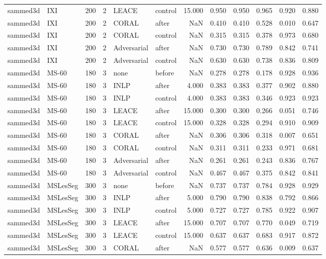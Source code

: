 \begin{tabular}{llrrllrrrrrr}
sammed3d & IXI & 200 & 2 & LEACE & control & 15.000 & 0.950 & 0.950 & 0.965 & 0.920 & 0.880 \\
sammed3d & IXI & 200 & 2 & CORAL & after & NaN & 0.410 & 0.410 & 0.528 & 0.010 & 0.647 \\
sammed3d & IXI & 200 & 2 & CORAL & control & NaN & 0.315 & 0.315 & 0.378 & 0.973 & 0.680 \\
sammed3d & IXI & 200 & 2 & Adversarial & after & NaN & 0.730 & 0.730 & 0.789 & 0.842 & 0.741 \\
sammed3d & IXI & 200 & 2 & Adversarial & control & NaN & 0.630 & 0.630 & 0.738 & 0.836 & 0.809 \\
sammed3d & MS-60 & 180 & 3 & none & before & NaN & 0.278 & 0.278 & 0.178 & 0.928 & 0.936 \\
sammed3d & MS-60 & 180 & 3 & INLP & after & 4.000 & 0.383 & 0.383 & 0.377 & 0.902 & 0.880 \\
sammed3d & MS-60 & 180 & 3 & INLP & control & 4.000 & 0.383 & 0.383 & 0.346 & 0.923 & 0.923 \\
sammed3d & MS-60 & 180 & 3 & LEACE & after & 15.000 & 0.300 & 0.300 & 0.266 & 0.051 & 0.746 \\
sammed3d & MS-60 & 180 & 3 & LEACE & control & 15.000 & 0.328 & 0.328 & 0.294 & 0.910 & 0.909 \\
sammed3d & MS-60 & 180 & 3 & CORAL & after & NaN & 0.306 & 0.306 & 0.318 & 0.007 & 0.651 \\
sammed3d & MS-60 & 180 & 3 & CORAL & control & NaN & 0.311 & 0.311 & 0.233 & 0.971 & 0.681 \\
sammed3d & MS-60 & 180 & 3 & Adversarial & after & NaN & 0.261 & 0.261 & 0.243 & 0.836 & 0.767 \\
sammed3d & MS-60 & 180 & 3 & Adversarial & control & NaN & 0.467 & 0.467 & 0.375 & 0.842 & 0.841 \\
sammed3d & MSLesSeg & 300 & 3 & none & before & NaN & 0.737 & 0.737 & 0.784 & 0.928 & 0.929 \\
sammed3d & MSLesSeg & 300 & 3 & INLP & after & 5.000 & 0.790 & 0.790 & 0.838 & 0.792 & 0.866 \\
sammed3d & MSLesSeg & 300 & 3 & INLP & control & 5.000 & 0.727 & 0.727 & 0.785 & 0.922 & 0.907 \\
sammed3d & MSLesSeg & 300 & 3 & LEACE & after & 15.000 & 0.707 & 0.707 & 0.770 & 0.049 & 0.719 \\
sammed3d & MSLesSeg & 300 & 3 & LEACE & control & 15.000 & 0.637 & 0.637 & 0.683 & 0.917 & 0.872 \\
sammed3d & MSLesSeg & 300 & 3 & CORAL & after & NaN & 0.577 & 0.577 & 0.636 & 0.009 & 0.637 \\

\end{tabular}
